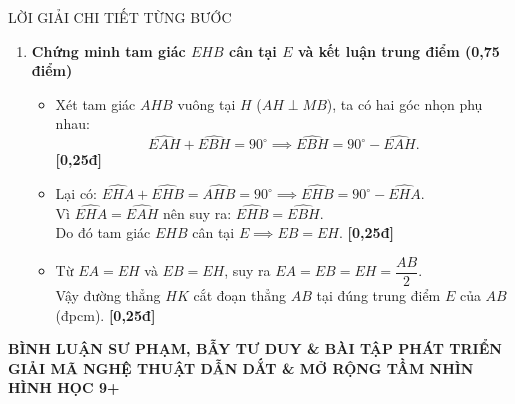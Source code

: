 \documentclass[11pt,a4paper]{article}
\begin{document}
\begin{solutionbox}{LỜI GIẢI CHI TIẾT TỪNG BƯỚC}
\begin{enumerate}[label=\textbf{\arabic*.}, leftmargin=*]
    \vspace{1mm}
    \item \textbf{Chứng minh tam giác $EHB$ cân tại $E$ và kết luận trung điểm (0,75 điểm)}
    \begin{itemize}[leftmargin=*, nosep]
        \item Xét tam giác $AHB$ vuông tại $H$ ($AH \perp MB$), ta có hai góc nhọn phụ nhau:
        \[
        \widehat{EAH} + \widehat{EBH} = 90^\circ \implies \widehat{EBH} = 90^\circ - \widehat{EAH}.
        \] \hfill \textbf{[0,25đ]}
        \item Lại có: $\widehat{EHA} + \widehat{EHB} = \widehat{AHB} = 90^\circ \implies \widehat{EHB} = 90^\circ - \widehat{EHA}$.\\
        Vì $\widehat{EHA} = \widehat{EAH}$ nên suy ra: $\widehat{EHB} = \widehat{EBH}$.\\
        Do đó tam giác $EHB$ cân tại $E \implies EB = EH$. \hfill \textbf{[0,25đ]}
        \item Từ $EA = EH$ và $EB = EH$, suy ra $EA = EB = EH = \dfrac{AB}{2}$.\\
        Vậy đường thẳng $HK$ cắt đoạn thẳng $AB$ tại đúng trung điểm $E$ của $AB$ (đpcm). \hfill \textbf{[0,25đ]}
    \end{itemize}
\end{enumerate}
\end{solutionbox}

\newpage

\begin{center}
    {\Large\bfseries\color{blue!80!black} BÌNH LUẬN SƯ PHẠM, BẪY TƯ DUY \& BÀI TẬP PHÁT TRIỂN}\\[1.5mm]
    {\large\bfseries GIẢI MÃ NGHỆ THUẬT DẪN DẮT \& MỞ RỘNG TẦM NHÌN HÌNH HỌC 9+}
\end{center}

\vspace{1mm}
\end{document}
